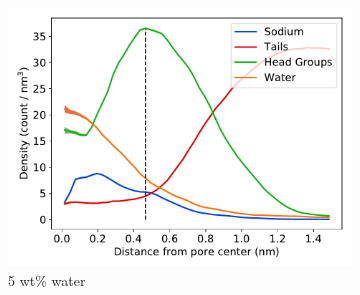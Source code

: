 \documentclass{article}
\begin{document}
  \begin{figure}[!htb]
  \centering
  \begin{subfigure}{0.415\textwidth}
  \includegraphics[width=\textwidth]{component_density_5wt.pdf}
  \caption{5 wt\% water}\label{fig:component_density_5wt}
  \end{subfigure}
  \begin{subfigure}{0.15\textwidth}
  \vspace{-0.5cm}

\end{subfigure}
\end{figure}
\end{document}
